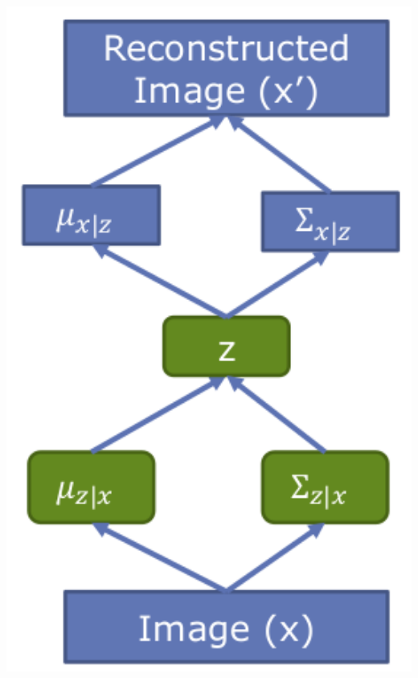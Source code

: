 \begin{minipage}{0.2\textwidth}
    \includegraphics[width=1\textwidth]{sections/GeneratingImages/img/vae.png}
\end{minipage}

